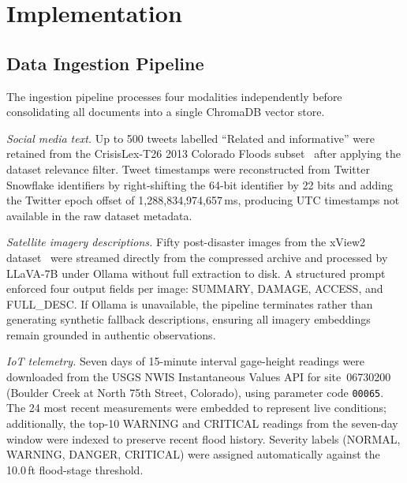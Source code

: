 
\section{Implementation}

\subsection{Data Ingestion Pipeline}

The ingestion pipeline processes four modalities independently before
consolidating all documents into a single ChromaDB vector store.

\textit{Social media text.} Up to 500 tweets labelled ``Related and
informative'' were retained from the CrisisLex-T26 2013 Colorado Floods
subset~\cite{b21} after applying the dataset relevance filter. Tweet
timestamps were reconstructed from Twitter Snowflake identifiers by
right-shifting the 64-bit identifier by 22 bits and adding the Twitter
epoch offset of 1{,}288{,}834{,}974{,}657\,ms, producing UTC timestamps not
available in the raw dataset metadata.

\textit{Satellite imagery descriptions.} Fifty post-disaster images from the
xView2 dataset~\cite{b22} were streamed directly from the compressed archive
and processed by LLaVA-7B under Ollama without full extraction to disk. A
structured prompt enforced four output fields per image: SUMMARY, DAMAGE,
ACCESS, and FULL\_DESC. If Ollama is unavailable, the pipeline terminates
rather than generating synthetic fallback descriptions, ensuring all imagery
embeddings remain grounded in authentic observations.

\textit{IoT telemetry.} Seven days of 15-minute interval gage-height readings
were downloaded from the USGS NWIS Instantaneous Values API for site~06730200
(Boulder Creek at North 75th Street, Colorado), using parameter code
\texttt{00065}. The 24 most recent measurements were embedded to represent
live conditions; additionally, the top-10 WARNING and CRITICAL readings from
the seven-day window were indexed to preserve recent flood history. Severity
labels (NORMAL, WARNING, DANGER, CRITICAL) were assigned automatically against
the 10.0\,ft flood-stage threshold.


